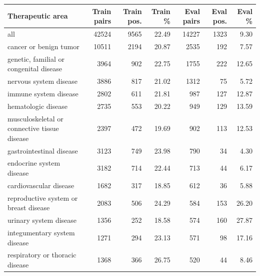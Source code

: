 \begin{tabular}{lrrrrrr}
\toprule
Therapeutic area & Train pairs & Train pos. & Train \% & Eval pairs & Eval pos. & Eval \% \\
\midrule
all & 42524 & 9565 & 22.49 & 14227 & 1323 & 9.30 \\
cancer or benign tumor & 10511 & 2194 & 20.87 & 2535 & 192 & 7.57 \\
genetic, familial or congenital disease & 3964 & 902 & 22.75 & 1755 & 222 & 12.65 \\
nervous system disease & 3886 & 817 & 21.02 & 1312 & 75 & 5.72 \\
immune system disease & 2802 & 611 & 21.81 & 987 & 127 & 12.87 \\
hematologic disease & 2735 & 553 & 20.22 & 949 & 129 & 13.59 \\
musculoskeletal or connective tissue disease & 2397 & 472 & 19.69 & 902 & 113 & 12.53 \\
gastrointestinal disease & 3123 & 749 & 23.98 & 790 & 34 & 4.30 \\
endocrine system disease & 3182 & 714 & 22.44 & 713 & 44 & 6.17 \\
cardiovascular disease & 1682 & 317 & 18.85 & 612 & 36 & 5.88 \\
reproductive system or breast disease & 2083 & 506 & 24.29 & 584 & 153 & 26.20 \\
urinary system disease & 1356 & 252 & 18.58 & 574 & 160 & 27.87 \\
integumentary system disease & 1271 & 294 & 23.13 & 571 & 98 & 17.16 \\
respiratory or thoracic disease & 1368 & 366 & 26.75 & 520 & 44 & 8.46 \\
\bottomrule
\end{tabular}
